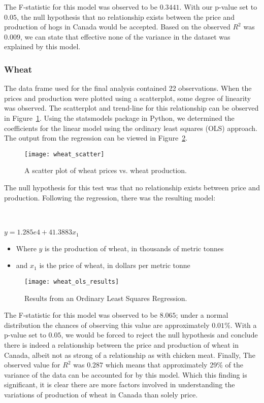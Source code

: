 The F-statistic for this model was observed to be $0.3441$.
With our p-value set to $0.05$, the null hypothesis that no relationship exists between the price and production of hogs in Canada would be accepted.
Based on the observed $R^2$ was $0.009$, we can state that effective none of the variance in the dataset was explained by this model.

\subsubsection{Wheat}

The data frame used for the final analysis contained 22 observations.
When the prices and production were plotted using a scatterplot, some degree of linearity was observed.
The scatterplot and trend-line for this relationship can be observed in Figure~\ref{fig:wheat_scatter}.
Using the statsmodels package in Python, we determined the coefficients for the linear model using the ordinary least squares (OLS) approach.
The output from the regression can be viewed in Figure~\ref{fig:wheat_ols}.

\begin{figure}
    \texttt{[image: wheat\_scatter]}
    \caption{A scatter plot of wheat prices vs. wheat production.}
    \label{fig:wheat_scatter}
\end{figure}

The null hypothesis for this test was that no relationship exists between price and production.
Following the regression, there was the resulting model:

\\~\\

\tabto{5cm} $y = 1.285e4 + 41.3883x_1$

\begin{itemize}
    \item Where $y$ is the production of wheat, in thousands of metric tonnes
    \item and $x_1$ is the price of wheat, in dollars per metric tonne
\end{itemize}

\begin{figure}
    \texttt{[image: wheat\_ols\_results]}
    \caption{Results from an Ordinary Least Squares Regression.}
    \label{fig:wheat_ols}
\end{figure}

The F-statistic for this model was observed to be $8.065$; under a normal distribution the chances of observing this value are approximately $0.01\%$.
With a p-value set to $0.05$, we would be forced to reject the null hypothesis and conclude there is indeed a relationship between the price and production of wheat in Canada, albeit not as strong of a relationship as with chicken meat.
Finally, The observed value for $R^2$ was $0.287$ which means that approximately 29\% of the variance of the data can be accounted for by this model.
Which this finding is significant, it is clear there are more factors involved in understanding the variations of production of wheat in Canada than solely price.


